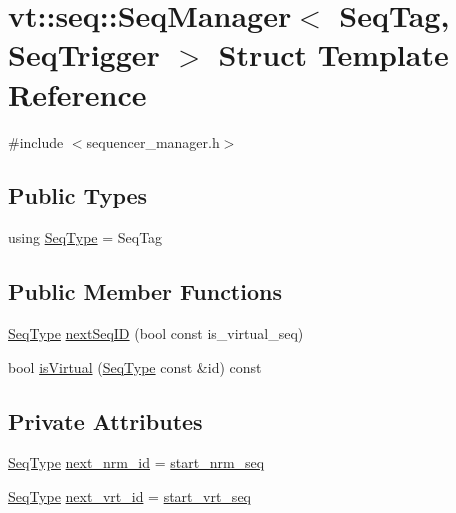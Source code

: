 \hypertarget{structvt_1_1seq_1_1_seq_manager}{}\section{vt\+:\+:seq\+:\+:Seq\+Manager$<$ Seq\+Tag, Seq\+Trigger $>$ Struct Template Reference}
\label{structvt_1_1seq_1_1_seq_manager}


{\ttfamily \#include $<$sequencer\+\_\+manager.\+h$>$}

\subsection*{Public Types}
\begin{DoxyCompactItemize}
\item 
using \hyperlink{structvt_1_1seq_1_1_seq_manager_a46a40595599aa666e9cf9f46ee30cfde}{Seq\+Type} = Seq\+Tag
\end{DoxyCompactItemize}
\subsection*{Public Member Functions}
\begin{DoxyCompactItemize}
\item 
\hyperlink{structvt_1_1seq_1_1_seq_manager_a46a40595599aa666e9cf9f46ee30cfde}{Seq\+Type} \hyperlink{structvt_1_1seq_1_1_seq_manager_ae234b99884c47802516dece955b66e56}{next\+Seq\+ID} (bool const is\+\_\+virtual\+\_\+seq)
\item 
bool \hyperlink{structvt_1_1seq_1_1_seq_manager_a9a5b739e65924f54a962b75435e53dd3}{is\+Virtual} (\hyperlink{structvt_1_1seq_1_1_seq_manager_a46a40595599aa666e9cf9f46ee30cfde}{Seq\+Type} const \&id) const
\end{DoxyCompactItemize}
\subsection*{Private Attributes}
\begin{DoxyCompactItemize}
\item 
\hyperlink{structvt_1_1seq_1_1_seq_manager_a46a40595599aa666e9cf9f46ee30cfde}{Seq\+Type} \hyperlink{structvt_1_1seq_1_1_seq_manager_abe1ace08cad5e5554ce2ad0faf9d78ad}{next\+\_\+nrm\+\_\+id} = \hyperlink{structvt_1_1seq_1_1_seq_manager_a71ef8ed323c68ade7d3b46b99c81846d}{start\+\_\+nrm\+\_\+seq}
\item 
\hyperlink{structvt_1_1seq_1_1_seq_manager_a46a40595599aa666e9cf9f46ee30cfde}{Seq\+Type} \hyperlink{structvt_1_1seq_1_1_seq_manager_aa76d48546de0c1eba39bd44212f554b4}{next\+\_\+vrt\+\_\+id} = \hyperlink{structvt_1_1seq_1_1_seq_manager_aae6446338964093292b8dcaa79d77f96}{start\+\_\+vrt\+\_\+seq}
\end{DoxyCompactItemize}
